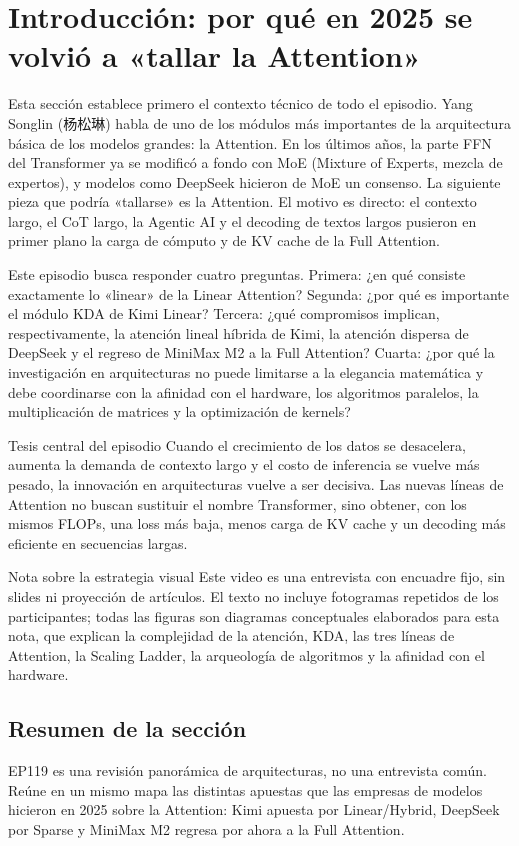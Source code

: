 \section{Introducción: por qué en 2025 se volvió a «tallar la Attention»}

Esta sección establece primero el contexto técnico de todo el episodio. Yang Songlin (杨松琳) habla de uno de los módulos más importantes de la arquitectura básica de los modelos grandes: la Attention. En los últimos años, la parte FFN del Transformer ya se modificó a fondo con MoE (Mixture of Experts, mezcla de expertos), y modelos como DeepSeek hicieron de MoE un consenso. La siguiente pieza que podría «tallarse» es la Attention. El motivo es directo: el contexto largo, el CoT largo, la Agentic AI y el decoding de textos largos pusieron en primer plano la carga de cómputo y de KV cache de la Full Attention.

Este episodio busca responder cuatro preguntas. Primera: ¿en qué consiste exactamente lo «linear» de la Linear Attention? Segunda: ¿por qué es importante el módulo KDA de Kimi Linear? Tercera: ¿qué compromisos implican, respectivamente, la atención lineal híbrida de Kimi, la atención dispersa de DeepSeek y el regreso de MiniMax M2 a la Full Attention? Cuarta: ¿por qué la investigación en arquitecturas no puede limitarse a la elegancia matemática y debe coordinarse con la afinidad con el hardware, los algoritmos paralelos, la multiplicación de matrices y la optimización de kernels?

\begin{importantbox}{Tesis central del episodio}
Cuando el crecimiento de los datos se desacelera, aumenta la demanda de contexto largo y el costo de inferencia se vuelve más pesado, la innovación en arquitecturas vuelve a ser decisiva. Las nuevas líneas de Attention no buscan sustituir el nombre Transformer, sino obtener, con los mismos FLOPs, una loss más baja, menos carga de KV cache y un decoding más eficiente en secuencias largas.
\end{importantbox}

\begin{knowledgebox}{Nota sobre la estrategia visual}
Este video es una entrevista con encuadre fijo, sin slides ni proyección de artículos. El texto no incluye fotogramas repetidos de los participantes; todas las figuras son diagramas conceptuales elaborados para esta nota, que explican la complejidad de la atención, KDA, las tres líneas de Attention, la Scaling Ladder, la arqueología de algoritmos y la afinidad con el hardware.
\end{knowledgebox}

\subsection{Resumen de la sección}

EP119 es una revisión panorámica de arquitecturas, no una entrevista común. Reúne en un mismo mapa las distintas apuestas que las empresas de modelos hicieron en 2025 sobre la Attention: Kimi apuesta por Linear/Hybrid, DeepSeek por Sparse y MiniMax M2 regresa por ahora a la Full Attention.
